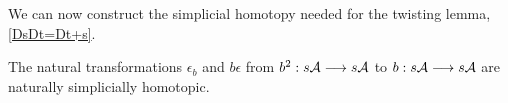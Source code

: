 \documentclass[11pt]{amsart}
\theoremstyle{plain}
\begin{document}
We can now construct the simplicial homotopy needed for the twisting lemma, \ref{DsDt=Dt+s}.
\begin{prop}\label{IteratedBarConstructionHomotopy}
The natural transformations $\epsilon_b$ and $b\epsilon$ from $b^2:s\mathcal{A}\longrightarrow s\mathcal{A}$ to $b:s\mathcal{A}\longrightarrow s\mathcal{A}$ are naturally simplicially homotopic.
\end{prop}
\end{document}
